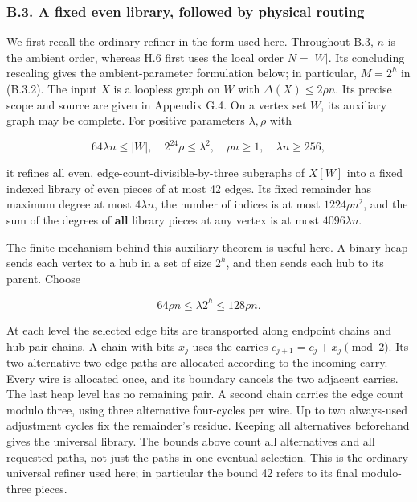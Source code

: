 \documentclass[english,11pt,a4paper]{article}
\begin{document}
\subsubsection{B.3. A fixed even library, followed by physical routing}\label{b.3.-a-fixed-even-library-followed-by-physical-routing}

We first recall the ordinary refiner in the form used here. Throughout B.3, \(n\) is the ambient order, whereas H.6 first uses the local order \(N=|W|\). Its concluding rescaling gives the ambient-parameter formulation below; in particular, \(M=2^h\) in (B.3.2). The input \(X\) is a loopless graph on \(W\) with \(\Delta(X)\le2\rho n\). Its precise scope and source are given in Appendix G.4. On a vertex set \(W\), its auxiliary graph may be complete. For positive parameters \(\lambda,\rho\) with

\[64\lambda n\le |W|,\quad 2^{24}\rho\le\lambda^2,
\quad \rho n\ge1,\quad\lambda n\ge256,
\tag{B.3.1}\]

it refines all even, edge-count-divisible-by-three subgraphs of \(X[W]\) into a fixed indexed library of even pieces of at most 42 edges. Its fixed remainder has maximum degree at most \(4\lambda n\), the number of indices is at most \(1224\rho n^2\), and the sum of the degrees of \textbf{all} library pieces at any vertex is at most \(4096\lambda n\).

The finite mechanism behind this auxiliary theorem is useful here. A binary heap sends each vertex to a hub in a set of size \(2^h\), and then sends each hub to its parent. Choose

\[64\rho n\le\lambda2^h\le128\rho n.
\tag{B.3.2}\]

At each level the selected edge bits are transported along endpoint chains and hub-pair chains. A chain with bits \(x_j\) uses the carries \(c_{j+1}=c_j+x_j\pmod2\). Its two alternative two-edge paths are allocated according to the incoming carry. Every wire is allocated once, and its boundary cancels the two adjacent carries. The last heap level has no remaining pair. A second chain carries the edge count modulo three, using three alternative four-cycles per wire. Up to two always-used adjustment cycles fix the remainder's residue. Keeping all alternatives beforehand gives the universal library. The bounds above count all alternatives and all requested paths, not just the paths in one eventual selection. This is the ordinary universal refiner used here; in particular the bound 42 refers to its final modulo-three pieces.
\end{document}
